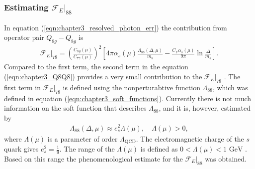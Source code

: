 \subsubsection{Estimating $\mathcal{F}_E|_{88}$}\label{subsec:F_88}
\vspace{-0.2cm}
In equation (\ref{eqn:chapter3_resolved_photon_err}) the contribution from operator pair $Q_{8g}-Q_{8g}$ is 
\begin{eqnarray}\label{eqn:chapter3_Q8Q8}
\mathcal{F}_E|_{78}=\left(\frac{C_{8 g}(\mu)}{C_{7 \gamma}(\mu)}\right)^{2}\left[4 \pi \alpha_{s}(\mu) \frac{\Lambda_{88}(\Delta, \mu)}{m_{b}}-\frac{C_{F} \alpha_{s}(\mu)}{9 \pi} \ln \frac{\Delta}{m_{b}}\right].
\end{eqnarray}
\vspace{0.2cm}
Compared to the first term, the second term in the equation (\ref{eqn:chapter3_Q8Q8}) provides a very small contribution to the $\mathcal{F}_E|_{78}$ \cite{Benzke:2010js}. The first term in $\mathcal{F}_E|_{78}$ is defined using the nonperturabtive function $\Lambda_{88}$, which was defined in equation (\ref{eqn:chapter3_soft_functions}). Currently there is not much information on the soft function that describes $\Lambda_{88}$, and it is, however, estimated by \cite{Benzke:2010js} 
\begin{eqnarray}
\Lambda_{88}(\Delta, \mu) \approx e_{s}^{2} \Lambda(\mu), \quad \Lambda(\mu)>0,
\end{eqnarray}
where $\Lambda(\mu)$ is a parameter of order $\Lambda_{\mathrm{QCD}}$. The electromagnetic charge of the $s$ quark gives $e^2_s=\frac{1}{9}$. The range of the $\Lambda(\mu)$ is defined as $0<\Lambda(\mu)<1\text{ GeV}$ \cite{Benzke:2010js}. Based on this range the phenomenological estimate for the $\mathcal{F}_E|_{88}$ was obtained.
\vspace{-0.3cm}
